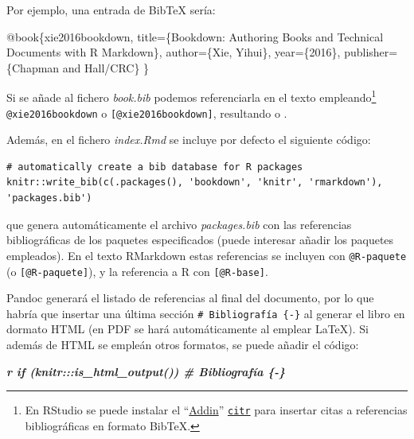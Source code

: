 \documentclass[
]{book}
\newenvironment{Shaded}{\begin{snugshade}}{\end{snugshade}}
\newcommand{\DataTypeTok}[1]{\textcolor[rgb]{0.13,0.29,0.53}{#1}}
\newcommand{\InformationTok}[1]{\textcolor[rgb]{0.56,0.35,0.01}{\textbf{\textit{#1}}}}
\newcommand{\NormalTok}[1]{#1}
\newcommand{\OtherTok}[1]{\textcolor[rgb]{0.56,0.35,0.01}{#1}}
\newcommand{\VariableTok}[1]{\textcolor[rgb]{0.00,0.00,0.00}{#1}}
\theoremstyle{definition}
\theoremstyle{definition}
\theoremstyle{definition}
\theoremstyle{definition}
\theoremstyle{remark}
\begin{document}
Por ejemplo, una entrada de BibTeX sería:

\begin{Shaded}
\begin{Highlighting}[]
\VariableTok{@book}\NormalTok{\{}\OtherTok{xie2016bookdown}\NormalTok{,}
  \DataTypeTok{title}\NormalTok{=\{Bookdown: Authoring Books and Technical Documents with R Markdown\},}
  \DataTypeTok{author}\NormalTok{=\{Xie, Yihui\},}
  \DataTypeTok{year}\NormalTok{=\{2016\},}
  \DataTypeTok{publisher}\NormalTok{=\{Chapman and Hall/CRC\}}
\NormalTok{\}}
\end{Highlighting}
\end{Shaded}

Si se añade al fichero \emph{book.bib} podemos referenciarla en el texto
empleando\footnote{En RStudio se puede instalar el ``\href{https://rstudio.github.io/rstudioaddins/}{Addin}''
  \href{https://github.com/crsh/citr}{\texttt{citr}} para insertar
  citas a referencias bibliográficas en formato BibTeX.}
\texttt{@xie2016bookdown} o \texttt{{[}@xie2016bookdown{]}}, resultando \citet{xie2016bookdown} o \citep{xie2016bookdown}.

Además, en el fichero \emph{index.Rmd} se incluye por defecto el siguiente código:

\begin{verbatim}
# automatically create a bib database for R packages
knitr::write_bib(c(.packages(), 'bookdown', 'knitr', 'rmarkdown'), 'packages.bib')
\end{verbatim}

que genera automáticamente el archivo \emph{packages.bib} con las referencias bibliográficas de los
paquetes especificados (puede interesar añadir los paquetes empleados).
En el texto RMarkdown estas referencias se incluyen con \texttt{@R-paquete} (o \texttt{{[}@R-paquete{]}}), y
la referencia a R \citep{R-base} con \texttt{{[}@R-base{]}}.

Pandoc generará el listado de referencias al final del documento,
por lo que habría que insertar una última sección \texttt{\#\ Bibliografía\ \{-\}}
al generar el libro en dormato HTML (en PDF se hará automáticamente al emplear LaTeX).
Si además de HTML se empleán otros formatos, se puede añadir el código:

\begin{Shaded}
\begin{Highlighting}[]
\InformationTok{\textasciigrave{}r if (knitr:::is\_html\_output()) \textquotesingle{}\# Bibliografía \{{-}\}\textquotesingle{}\textasciigrave{}}
\end{Highlighting}
\end{Shaded}
\end{document}
